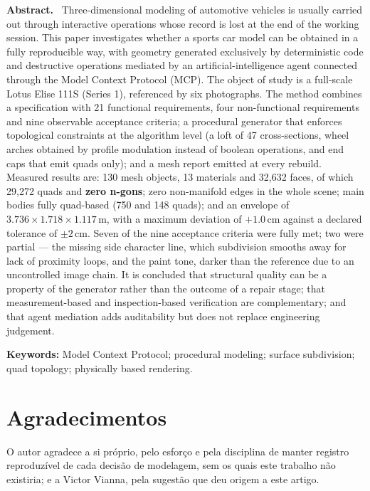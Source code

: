\documentclass[10pt,a4paper]{article}
\newenvironment{abstracten}
  {\par\vspace{2pt}\begin{center}\begin{minipage}{0.92\textwidth}\small\noindent\textbf{Abstract.}\ \ignorespaces}
  {\end{minipage}\end{center}\par}
\newcommand{\keywords}[1]{\par\vspace{2pt}\begin{center}\begin{minipage}{0.92\textwidth}\small\noindent\textbf{Keywords:} #1\end{minipage}\end{center}\par\vspace{8pt}}
\begin{document}
\begin{abstracten}
Three-dimensional modeling of automotive vehicles is usually carried out through
interactive operations whose record is lost at the end of the working session. This paper
investigates whether a sports car model can be obtained in a fully reproducible way, with
geometry generated exclusively by deterministic code and destructive operations mediated by
an artificial-intelligence agent connected through the Model Context Protocol (MCP). The
object of study is a full-scale Lotus Elise 111S (Series 1), referenced by six photographs.
The method combines a specification with 21 functional requirements, four non-functional
requirements and nine observable acceptance criteria; a procedural generator that enforces
topological constraints at the algorithm level (a loft of 47 cross-sections, wheel arches
obtained by profile modulation instead of boolean operations, and end caps that emit quads
only); and a mesh report emitted at every rebuild. Measured results are: 130 mesh objects,
13 materials and 32,632 faces, of which 29,272 quads and \textbf{zero n-gons}; zero
non-manifold edges in the whole scene; main bodies fully quad-based (750 and 148 quads);
and an envelope of $3.736 \times 1.718 \times 1.117$\,m, with a maximum deviation of
$+1.0$\,cm against a declared tolerance of $\pm2$\,cm. Seven of the nine acceptance
criteria were fully met; two were partial --- the missing side character line, which
subdivision smooths away for lack of proximity loops, and the paint tone, darker than the
reference due to an uncontrolled image chain. It is concluded that structural quality can
be a property of the generator rather than the outcome of a repair stage; that
measurement-based and inspection-based verification are complementary; and that agent
mediation adds auditability but does not replace engineering judgement.
\end{abstracten}
\keywords{Model Context Protocol; procedural modeling; surface subdivision; quad
topology; physically based rendering.}










\section*{Agradecimentos}
O autor agradece a si pr\'oprio, pelo esfor\c{c}o e pela disciplina de manter registro
reproduz\'ivel de cada decis\~ao de modelagem, sem os quais este trabalho n\~ao existiria;
e a Victor Vianna, pela sugest\~ao que deu origem a este artigo.


{\footnotesize

}
\end{document}
